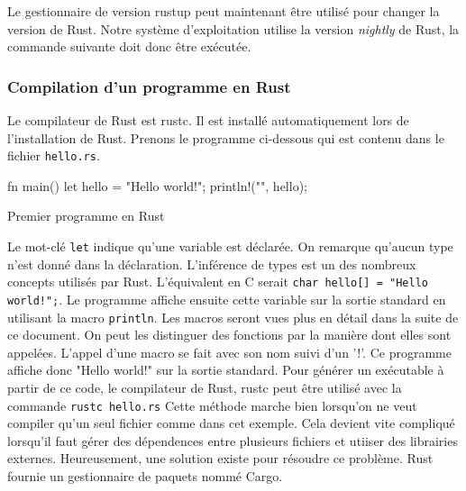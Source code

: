 Le gestionnaire de version rustup peut maintenant être utilisé pour changer la
version de Rust. Notre système d'exploitation utilise la version \textit{nightly}
de Rust, la commande suivante doit donc être exécutée.



\subsubsection{Compilation d'un programme en Rust}
Le compilateur de Rust est rustc. Il est installé automatiquement lors de
l'installation de Rust. Prenons le programme ci-dessous qui est contenu
dans le fichier \texttt{hello.rs}.

\begin{code}
\begin{rustcode}
fn main() {
    let hello = "Hello world!";
    println!("{}", hello);
}
\end{rustcode}
\caption{Premier programme en Rust}
\label{lst:rust:hello}
\end{code} \bigbreak

Le mot-clé \texttt{let} indique qu'une variable est déclarée. On remarque
qu'aucun type n'est donné dans la déclaration. L'inférence de types est un des
nombreux concepts utilisés par Rust. L'équivalent en C serait
\texttt{char hello[] = "Hello world!";}. Le programme affiche ensuite cette
variable sur la sortie standard en utilisant la macro \texttt{println}.
Les macros seront vues plus en détail dans la suite de ce document. On peut les
distinguer des fonctions par la manière dont elles sont appelées. L'appel d'une
macro se fait avec son nom suivi d'un '!'. Ce programme affiche donc "Hello world!"
sur la sortie standard. Pour générer un exécutable à partir de ce code, le compilateur
de Rust, rustc peut être utilisé avec la commande \texttt{rustc hello.rs}
Cette méthode marche bien lorsqu'on ne veut compiler qu'un seul fichier comme dans
cet exemple. Cela devient vite compliqué lorsqu'il faut gérer des dépendences
entre plusieurs fichiers et utiiser des librairies externes. Heureusement,
une solution existe pour résoudre ce problème. Rust fournie un gestionnaire
de paquets nommé Cargo.


